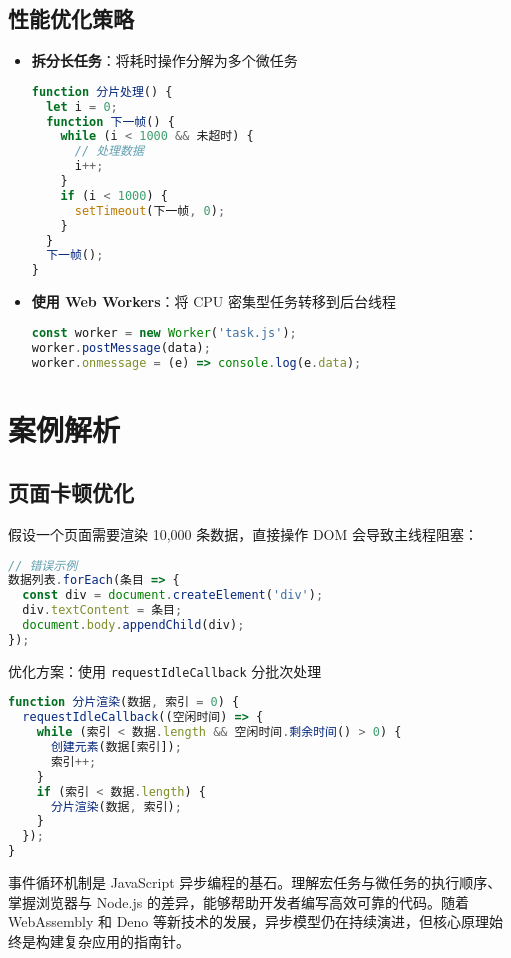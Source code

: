 \section{性能优化策略}
\begin{itemize}
\item \textbf{拆分长任务}：将耗时操作分解为多个微任务\begin{lstlisting}[language=javascript]
function 分片处理() {
  let i = 0;
  function 下一帧() {
    while (i < 1000 && 未超时) {
      // 处理数据
      i++;
    }
    if (i < 1000) {
      setTimeout(下一帧, 0);
    }
  }
  下一帧();
}
\end{lstlisting}

\item \textbf{使用 Web Workers}：将 CPU 密集型任务转移到后台线程\begin{lstlisting}[language=javascript]
const worker = new Worker('task.js');
worker.postMessage(data);
worker.onmessage = (e) => console.log(e.data);
\end{lstlisting}

\end{itemize}
\chapter{案例解析}
\section{页面卡顿优化}
假设一个页面需要渲染 10,000 条数据，直接操作 DOM 会导致主线程阻塞：\par
\begin{lstlisting}[language=javascript]
// 错误示例
数据列表.forEach(条目 => {
  const div = document.createElement('div');
  div.textContent = 条目;
  document.body.appendChild(div);
});
\end{lstlisting}
优化方案：使用 \verb!requestIdleCallback! 分批次处理\par
\begin{lstlisting}[language=javascript]
function 分片渲染(数据, 索引 = 0) {
  requestIdleCallback((空闲时间) => {
    while (索引 < 数据.length && 空闲时间.剩余时间() > 0) {
      创建元素(数据[索引]);
      索引++;
    }
    if (索引 < 数据.length) {
      分片渲染(数据, 索引);
    }
  });
}
\end{lstlisting}
事件循环机制是 JavaScript 异步编程的基石。理解宏任务与微任务的执行顺序、掌握浏览器与 Node.js 的差异，能够帮助开发者编写高效可靠的代码。随着 WebAssembly 和 Deno 等新技术的发展，异步模型仍在持续演进，但核心原理始终是构建复杂应用的指南针。\par
